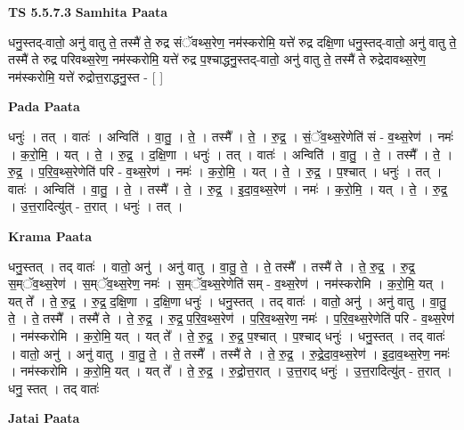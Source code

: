 \documentclass[17pt]{extarticle}
\begin{document}
\textbf{TS 5.5.7.3 } \newline
\textbf{Samhita Paata} \newline

धनु॒स्तद्-वातो॒ अनु॑ वातु ते॒ तस्मै॑ ते॒ रुद्र संॅवथ्स॒रेण॒ नम॑स्करोमि॒ यत्ते॑ रुद्र दक्षि॒णा धनु॒स्तद्-वातो॒ अनु॑ वातु ते॒ तस्मै॑ ते रुद्र परिवथ्स॒रेण॒ नम॑स्करोमि॒ यत्ते॑ रुद्र प॒श्चाद्धनु॒स्तद्-वातो॒ अनु॑ वातु ते॒ तस्मै॑ ते रुद्रेदावथ्स॒रेण॒ नम॑स्करोमि॒ यत्ते॑ रुद्रोत्त॒राद्धनु॒स्त - [  ] \newline

\textbf{Pada Paata} \newline

धनुः॑ । तत् । वातः॑ । अन्विति॑ । वा॒तु॒ । ते॒ । तस्मै᳚ । ते॒ । रु॒द्र॒ । सं॒ॅव॒थ्स॒रेणेति॑ सं - व॒थ्स॒रेण॑ । नमः॑ । क॒रो॒मि॒ । यत् । ते॒ । रु॒द्र॒ । द॒क्षि॒णा । धनुः॑ । तत् । वातः॑ । अन्विति॑ । वा॒तु॒ । ते॒ । तस्मै᳚ । ते॒ । रु॒द्र॒ । प॒रि॒व॒थ्स॒रेणेति॑ परि - व॒थ्स॒रेण॑ । नमः॑ । क॒रो॒मि॒ । यत् । ते॒ । रु॒द्र॒ । प॒श्चात् । धनुः॑ । तत् । वातः॑ । अन्विति॑ । वा॒तु॒ । ते॒ । तस्मै᳚ । ते॒ । रु॒द्र॒ । इ॒दा॒व॒थ्स॒रेण॑ । नमः॑ । क॒रो॒मि॒ । यत् । ते॒ । रु॒द्र॒ । उ॒त्त॒रादित्यु॑त् - त॒रात् । धनुः॑ । तत् ।  \newline


\textbf{Krama Paata} \newline

धनु॒स्तत् । तद् वातः॑ । वातो॒ अनु॑ । अनु॑ वातु । वा॒तु॒ ते॒ । ते॒ तस्मै᳚ । तस्मै॑ ते । ते॒ रु॒द्र॒ । रु॒द्र॒ स॒म्ॅव॒थ्स॒रेण॑ । स॒म्ॅव॒थ्स॒रेण॒ नमः॑ । स॒म्ॅव॒थ्स॒रेणेति॑ सम् - व॒थ्स॒रेण॑ । नम॑स्करोमि । क॒रो॒मि॒ यत् । यत् ते᳚ । ते॒ रु॒द्र॒ । रु॒द्र॒ द॒क्षि॒णा । द॒क्षि॒णा धनुः॑ । धनु॒स्तत् । तद् वातः॑ । वातो॒ अनु॑ । अनु॑ वातु । वा॒तु॒ ते॒ । ते॒ तस्मै᳚ । तस्मै॑ ते । ते॒ रु॒द्र॒ । रु॒द्र॒ प॒रि॒व॒थ्स॒रेण॑ । प॒रि॒व॒थ्स॒रेण॒ नमः॑ । प॒रि॒व॒थ्स॒रेणेति॑ परि - व॒थ्स॒रेण॑ । नम॑स्करोमि । क॒रो॒मि॒ यत् । यत् ते᳚ । ते॒ रु॒द्र॒ । रु॒द्र॒ प॒श्चात् । प॒श्चाद् धनुः॑ । धनु॒स्तत् । तद् वातः॑ । वातो॒ अनु॑ । अनु॑ वातु । वा॒तु॒ ते॒ । ते॒ तस्मै᳚ । तस्मै॑ ते । ते॒ रु॒द्र॒ । रु॒द्रे॒दा॒व॒थ्स॒रेण॑ । इ॒दा॒व॒थ्स॒रेण॒ नमः॑ । नम॑स्करोमि । क॒रो॒मि॒ यत् । यत् ते᳚ । ते॒ रु॒द्र॒ । रु॒द्रो॒त्त॒रात् । उ॒त्त॒राद् धनुः॑ । उ॒त्त॒रादित्यु॑त् - त॒रात् । धनु॒ स्तत् । तद् वातः॑ \newline

\textbf{Jatai Paata} \newline
\end{document}
